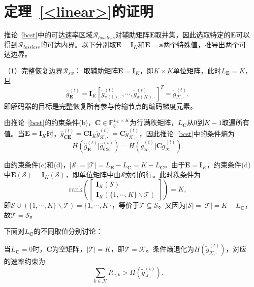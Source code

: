\section{定理~\ref{<linear>}的证明}\label{<linear-proof>}
推论~\ref{bcst}中的可达速率区域$\mathcal{R}_{lossless}$对辅助矩阵$\mathbf{E}$取并集，因此选取特定的$\mathbf{E}$可以得到$\mathcal{R}_{lossless}$的可达内界。以下分别取$\mathbf{E}=\mathbf{I}_K$和$\mathbf{E}=\mathbf{a}$两个特殊值，推导出两个可达边界。

（1）完整恢复边界$\mathcal{R}_{sw}$：
取辅助矩阵$\mathbf{E}=\mathbf{I}_K$，即$K\times K$单位矩阵，此时$L_{\mathbf{E}}=K$，且
\begin{equation}
	\hat{g}_{\mathbf{E}}^{(t)}=\mathbf{I}_K[\tilde{g}_{\pi(1),\cdot}^{(t)},\cdots,\tilde{g}_{\pi(K),\cdot}^{(t)}]^T=\tilde{g}_{\mathcal{K},\cdot}^{(t)},
\end{equation}
即解码器的目标是完整恢复所有参与传输节点的编码梯度元素。

由推论~\ref{bcst}的约束条件(b)，$\mathbf{C}\in\mathbb{F}_q^{L_{\mathbf{C}}\times K}$为行满秩矩阵，$L_{\mathbf{C}}$从$0$到$K-1$取遍所有值。当$\mathbf{E}=\mathbf{I}_K$时，$\hat{g}_{\mathbf{C}\mathbf{E}}^{(t)}=\mathbf{C}\mathbf{I}_K\tilde{g}_{\mathcal{K},\cdot}^{(t)}=\mathbf{C}\tilde{g}_{\mathcal{K},\cdot}^{(t)}$，因此推论~\ref{bcst}中的条件熵为
\begin{equation}
	H(\hat{g}_{\mathbf{E}}^{(t)}|\hat{g}_{\mathbf{C}\mathbf{E}}^{(t)})=H(\tilde{g}_{\mathcal{K},\cdot}^{(t)}|\mathbf{C}\tilde{g}_{\mathcal{K},\cdot}^{(t)}).
\end{equation}

由约束条件(c)和(d)，$|\mathcal{S}|=|\mathcal{T}|=L_{\mathbf{E}}-L_{\mathbf{C}}=K-L_{\mathbf{C}}$。由于$\mathbf{E}=\mathbf{I}_K$，约束条件(d)中$\mathbf{E}(\mathcal{S})=\mathbf{I}_K(\mathcal{S})$，即单位矩阵中由$\mathcal{S}$索引的行。此时秩条件为
\begin{equation}
	\mathrm{rank}\left(\begin{bmatrix}
		\mathbf{I}_K(\mathcal{S})\\
		\mathbf{I}_K(\{1,\cdots,K\}\backslash\mathcal{T})
	\end{bmatrix}\right)=K,
\end{equation}
即$\mathcal{S}\cup(\{1,\cdots,K\}\backslash\mathcal{T})=\{1,\cdots,K\}$，等价于$\mathcal{T}\subseteq\mathcal{S}$。又因为$|\mathcal{S}|=|\mathcal{T}|=K-L_{\mathbf{C}}$，故$\mathcal{T}=\mathcal{S}$。

下面对$L_{\mathbf{C}}$的不同取值分别讨论：

当$L_{\mathbf{C}}=0$时，$\mathbf{C}$为空矩阵，$|\mathcal{T}|=K$，即$\mathcal{T}=\mathcal{K}$。条件熵退化为$H(\tilde{g}_{\mathcal{K},\cdot}^{(t)})$，对应的速率约束为
\begin{equation}
	\sum_{k\in\mathcal{K}}\tilde{R}_{c,k}>H(\tilde{g}_{\mathcal{K},\cdot}^{(t)}).
\end{equation}

